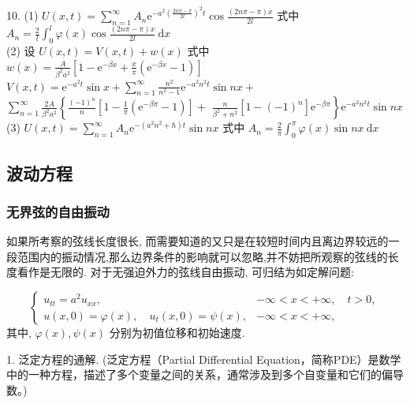 \begin{solution}
10. (1) $ U(x, t)=\sum\limits_{n=1}^{\infty} A_ n \mathrm{e}^{-a^{2}\left(\frac{2 n \pi-\pi}{2 l}\right)^{2} t} \cos \frac{(2 n \pi-\pi) x}{2 l} $
式中 $ A _n=\frac{2}{l} \int_{0}^{l} \varphi(x) \cos \frac{(2 n \pi-\pi) x}{2 l} \mathrm{~d} x $\\
(2) 设 $ U(x, t)=V(x, t)+w(x) $
式中 $ w(x)=\frac{A}{\beta^{2} a^{2}}\left[1-\mathrm{e}^{-\beta x}+\frac{x}{\pi}\left(\mathrm{e}^{-\beta x}-1\right)\right] $\\
$ V(x, t)=\mathrm{e}^{-a^{2} t} \sin x+\sum\limits_{n=1}^{\infty} \frac{n^{2}}{n^{2}-1} \mathrm{e}^{-a^{2} n^{2} t} \sin n x+ $\\
$ \sum\limits_{n=1}^{\infty} \frac{2 A}{\beta^{2} a^{2}}\left\{\frac{(-1)^{n}}{n}\left[1-\frac{1}{\pi}\left(\mathrm{e}^{-\beta \pi}-1\right)\right]+\right. $
$ \left.\frac{n}{\beta^{2}+n^{2}}\left[1-(-1)^{n}\right] \mathrm{e}^{-\beta \pi}\right\} \mathrm{e}^{-a^{2} n^{2} t} \sin n x $\\
(3) $ U(x, t)=\sum\limits_{n=1}^{\infty} A _n \mathrm{e}^{-\left(a^{2} n^{2}+h\right) t} \sin n x $
式中
$
A_ n=\frac{2}{\pi} \int_{0}^{\pi} \varphi(x) \sin n x \mathrm{~d} x
$

\end{solution}

\subsection{波动方程}
\subsubsection{无界弦的自由振动}

如果所考察的弦线长度很长, 而需要知道的又只是在较短时间内且离边界较远的一段范围内的振动情况,那么边界条件的影响就可以忽略,并不妨把所观察的弦线的长度看作是无限的. 对于无强迫外力的弦线自由振动, 可归结为如定解问题:

$$
\left\{\begin{array}{ll}
u_{t t}=a^{2} u_{x x}, & -\infty<x<+\infty, \quad t>0, \\
u(x, 0)=\varphi(x), \quad u_{t}(x, 0)=\psi(x), & -\infty<x<+\infty,
\end{array}\right.
$$
其中, $ \varphi(x), \psi(x) $ 分别为初值位移和初始速度.

1. 泛定方程的通解. (泛定方程（Partial Differential Equation，简称PDE）是数学中的一种方程，描述了多个变量之间的关系，通常涉及到多个自变量和它们的偏导数。)

